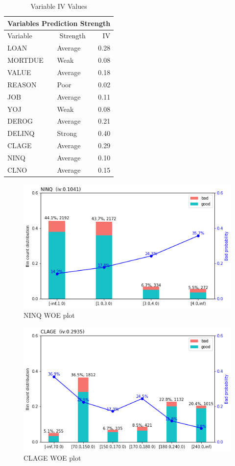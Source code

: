 \begin{table}[ht]\label{Table2}
	\centering
	\renewcommand{\arraystretch}{1.25}
	\begin{tabular}{llr}
	\multicolumn{3}{c}{Variables Prediction Strength}\\
	\hline
	Variable & \multicolumn{1}{c}{Strength} & IV\\ 
	\hline
	LOAN & Average & 0.28\\
	MORTDUE & Weak & 0.08\\
	VALUE & Average & 0.18\\
	REASON & Poor & 0.02\\
	JOB & Average & 0.11\\
	YOJ & Weak & 0.08\\
	DEROG & Average & 0.21\\
	DELINQ & Strong & 0.40\\
	CLAGE & Average & 0.29\\
	NINQ & Average & 0.10\\
	CLNO & Average & 0.15\\
	\bottomrule
	\end{tabular}
	\caption{Variable IV Values \label{table:iv_vals}}
\end{table}

\begin{figure}
\centering
  \centering
  \includegraphics[width=0.9\linewidth]{figs/ninq_woe_plot.png}
  \caption{NINQ WOE plot}
  \label{fig:NinqWoe}
\end{figure}

\begin{figure}
  \centering
 \includegraphics[width=0.9\linewidth]{figs/clage_woe_plot.png}
  \caption{CLAGE WOE plot}
  \label{fig:ClageWoe}
\end{figure}

